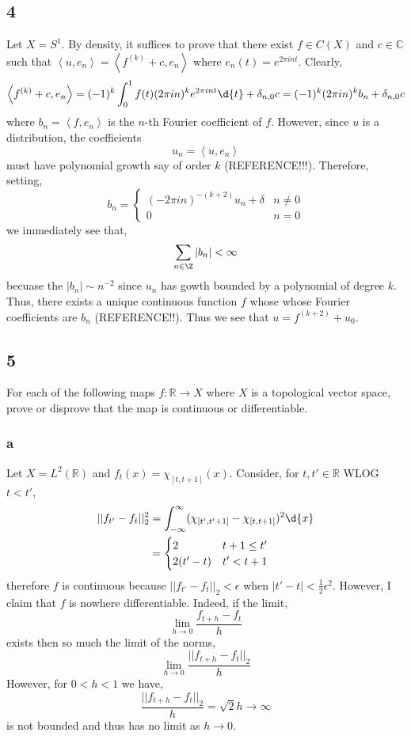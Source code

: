 \documentclass[12pt]{article}
\newcommand{\inner}[2]{\left< #1, #2 \right>}
\newcommand{\R}{\mathbb{R}}
\renewcommand{\C}{\mathbb{C}}
\begin{document}
\subsection{4}

Let $X = S^1$.
By density, it suffices to prove that there exist $f \in C(X)$ and $c \in \C$ such that $\inner{u}{e_n} = \inner{f^{(k)} + c}{e_n}$ where $e_n(t) = e^{2 \pi i n t}$. Clearly, 
\[ \inner{f^{(k)} + c}{e_n} = (-1)^k \int_{0}^1 f(t) (2 \pi i n)^k e^{2 \pi i n t} \d{t} + \delta_{n,0} c = (-1)^k (2 \pi i n)^k b_n + \delta_{n, 0} c \]
where $b_n = \inner{f}{e_n}$ is the $n$-th Fourier coefficient of $f$. However, since $u$ is a distribution, the coefficients
\[ u_n = \inner{u}{e_n} \]
must have polynomial growth say of order $k$ (REFERENCE!!!). Therefore, setting,
\[ b_n = \begin{cases}
(-2 \pi i n)^{-(k+2)} u_n + \delta & n \neq 0
\\
0 & n = 0
\end{cases} \]
we immediately see that,
\[ \sum_{n \in \Z} |b_n| < \infty \]
becuase the $|b_n| \sim n^{-2}$ since $u_n$ has gowth bounded by a polynomial of degree $k$. Thus, there exists a unique continuous function $f$ whose whose Fourier coefficients are $b_n$ (REFERENCE!!). Thus we see that $u = f^{(k+2)} + u_0$. 

\subsection{5}

For each of the following maps $f : \R \to X$ where $X$ is a topological vector space, prove or disprove that the map is continuous or differentiable.

\subsubsection{a}

Let $X = L^2(\R)$ and $f_t(x) = \chi_{[t, t+1]}(x)$. Consider, for $t, t' \in \R$ WLOG $t < t'$,
\begin{align*}
|| f_{t'} - f_t ||_2^2 & = \int_{-\infty}^{\infty} (\chi_{[t', t'+1]} - \chi_{[t, t + 1]})^2 \d{x} 
\\
& = 
\begin{cases}
2 & t + 1 \le t'
\\
2 (t' - t) & t' < t + 1
\end{cases} 
\end{align*}
therefore $f$ is continuous because $|| f_{t'} - f_t ||_2 < \epsilon$ when $| t' - t | < \tfrac{1}{2} \epsilon^2$. However, I claim that $f$ is nowhere differentiable. Indeed, if the limit,
\[ \lim_{h \to 0} \frac{f_{t + h} - f_t}{h} \]
exists then so much the limit of the norms,
\[ \lim_{h \to 0} \frac{|| f_{t + h} - f_t ||_2}{h} \]
However, for $0 < h < 1$ we have,
\[ \frac{|| f_{t + h} - f_t ||_2}{h} = \sqrt{2}{h} \to \infty \]
is not bounded and thus has no limit as $h \to 0$.
\end{document}
